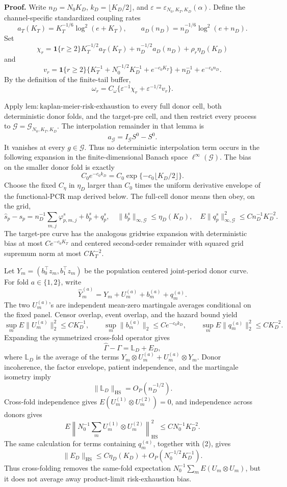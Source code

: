 \textbf{Proof.}
Write \(n_D=N_0K_D\), \(k_D=\lfloor K_D/2\rfloor\), and \(\varepsilon=\varepsilon_{N_0,K_T,K_D}(\alpha)\). Define the channel-specific standardized coupling rates
\[
 a_T(K_T)=K_T^{-1/6}\log^2(e+K_T),
 \qquad
 a_D(n_D)=n_D^{-1/6}\log^2(e+n_D).
\]
Set
\[
 \chi_r=\mathbf 1\{r\ge2\}K_T^{-1/2}a_T(K_T)
       +n_D^{-1/2}a_D(n_D)+\rho_r\eta_D(K_D)
\]
and
\[
 v_r=\mathbf 1\{r\ge2\}
 \{K_T^{-1}+N_0^{-1/2}K_D^{-1}+e^{-c_0K_T}\}
 +n_D^{-1}+e^{-c_0n_D}.
\]
By the definition of the finite-tail buffer,
\[
 \omega_r=C_\omega\{\varepsilon^{-1}\chi_r+\varepsilon^{-1/2}v_r\}. \tag{1}
\]

Apply \(\mathrm{lem:kaplan\mbox{-}meier\mbox{-}risk\mbox{-}exhaustion}\) to every full donor cell, both deterministic donor folds, and the target-pre cell, and then restrict every process to \(\mathcal G=\mathcal G_{N_0,K_T,K_D}\). The interpolation remainder in that lemma is
\[
 a_{\mathcal G}=I_{\mathcal G}S^0-S^0.
\]
It vanishes at every \(g\in\mathcal G\). Thus no deterministic interpolation term occurs in the following expansion in the finite-dimensional Banach space \(\ell^\infty(\mathcal G)\). The bias on the smaller donor fold is exactly
\[
 C_0e^{-c_0k_D}=C_0\exp\{-c_0\lfloor K_D/2\rfloor\}. \tag{2}
\]
Choose the fixed \(C_\eta\) in \(\eta_D\) larger than \(C_0\) times the uniform derivative envelope of the functional-PCR map derived below. The full-cell donor means then obey, on the grid,
\[
 \widehat s_p-s_p
 =n_D^{-1}\sum_{m,j}\varphi^s_{p,m,j}+b^s_p+q^s_p,
 \quad
 \|b^s_p\|_{\infty,\mathcal G}\le\eta_D(K_D),
 \quad
 E\|q^s_p\|_{\infty,\mathcal G}^2\le Cn_D^{-1}K_D^{-2}. \tag{3}
\]
The target-pre curve has the analogous gridwise expansion with deterministic bias at most \(Ce^{-c_0K_T}\) and centered second-order remainder with squared grid supremum norm at most \(CK_T^{-2}\).

Let \(Y_m=(b_0^\top z_m,b_1^\top z_m)\) be the population centered joint-period donor curve. For fold \(a\in\{1,2\}\), write
\[
 \widehat Y_m^{(a)}=Y_m+U_m^{(a)}+b_m^{(a)}+q_m^{(a)}. \tag{4}
\]
The two \(U_m^{(a)}\)'s are independent mean-zero martingale averages conditional on the fixed panel. Censor overlap, event overlap, and the hazard bound yield
\[
 \sup_mE\|U_m^{(a)}\|_2^2\le CK_D^{-1},\qquad
 \sup_m\|b_m^{(a)}\|_2\le Ce^{-c_0k_D},\qquad
 \sup_mE\|q_m^{(a)}\|_2^2\le CK_D^{-2}. \tag{5}
\]
Expanding the symmetrized cross-fold operator gives
\[
 \widehat\Gamma-\Gamma=\mathbb L_D+E_D, \tag{6}
\]
where \(\mathbb L_D\) is the average of the terms \(Y_m\otimes U_m^{(a)}+U_m^{(a)}\otimes Y_m\). Donor incoherence, the factor envelope, patient independence, and the martingale isometry imply
\[
 \|\mathbb L_D\|_{\mathrm{HS}}=O_P(n_D^{-1/2}). \tag{7}
\]
Cross-fold independence gives \(E(U_m^{(1)}\otimes U_m^{(2)})=0\), and independence across donors gives
\[
 E\left\|N_0^{-1}\sum_mU_m^{(1)}\otimes U_m^{(2)}\right\|_{\mathrm{HS}}^2
 \le CN_0^{-1}K_D^{-2}. \tag{8}
\]
The same calculation for terms containing \(q_m^{(a)}\), together with (2), gives
\[
 \|E_D\|_{\mathrm{HS}}
 \le C\eta_D(K_D)+O_P(N_0^{-1/2}K_D^{-1}). \tag{9}
\]
Thus cross-folding removes the same-fold expectation \(N_0^{-1}\sum_mE(U_m\otimes U_m)\), but it does not average away product-limit risk-exhaustion bias.

